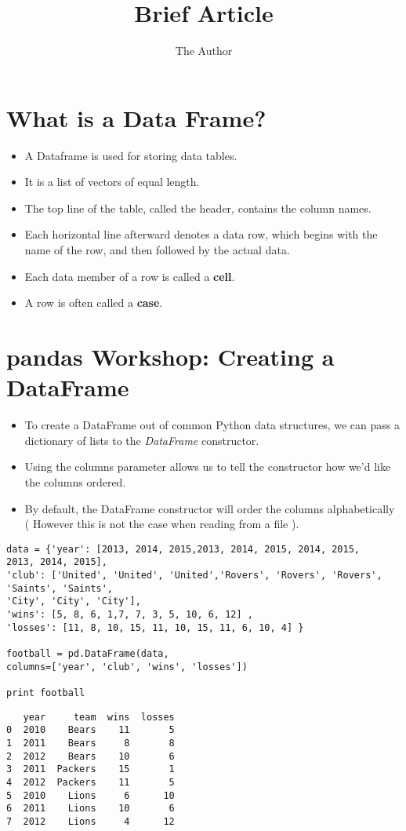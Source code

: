 \documentclass[11pt]{article} %
\title{Brief Article}
\author{The Author}
\begin{document}
	
\large

\section*{What is a Data Frame?}
\begin{itemize}
\item A Dataframe is used for storing data tables.
\item It is a list of vectors of equal length.
\item The top line of the table, called the header, contains the column names.
\item Each horizontal line afterward denotes a data row, which begins with the name of the row, and then followed by the actual data.
\item Each data member of a row is called a \textbf{cell}.
\item A row is often called a \textbf{case}.
\end{itemize}

\newpage
\section*{pandas Workshop: Creating a DataFrame}
\begin{itemize}
\item To create a DataFrame out of common Python data structures, we can pass a dictionary of lists to the \textit{DataFrame} constructor.

\item Using the columns parameter allows us to tell the constructor how we'd like the columns ordered. 
\item By default, the DataFrame constructor will order the columns alphabetically ( However this is not the case when reading from a file ).
\end{itemize}


\begin{framed}
\begin{verbatim}
data = {'year': [2013, 2014, 2015,2013, 2014, 2015, 2014, 2015, 
2013, 2014, 2015],
'club': ['United', 'United', 'United','Rovers', 'Rovers', 'Rovers', 
'Saints', 'Saints', 
'City', 'City', 'City'],
'wins': [5, 8, 6, 1,7, 7, 3, 5, 10, 6, 12] ,
'losses': [11, 8, 10, 15, 11, 10, 15, 11, 6, 10, 4] }

football = pd.DataFrame(data,
columns=['year', 'club', 'wins', 'losses'])

print football
\end{verbatim}
\end{framed}

\begin{verbatim}
   year     team  wins  losses
0  2010    Bears    11       5
1  2011    Bears     8       8
2  2012    Bears    10       6
3  2011  Packers    15       1
4  2012  Packers    11       5
5  2010    Lions     6      10
6  2011    Lions    10       6
7  2012    Lions     4      12

\end{verbatim}
\end{document}
